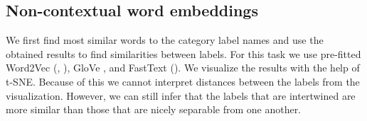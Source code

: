 \documentclass[fleqn,moreauthors,10pt]{ds_report}
\begin{document}
\subsection*{Non-contextual word embeddings}
We first find most similar words to the category label names and use the obtained results to find similarities between labels. For this task we use pre-fitted Word2Vec (\cite{mikolov2013efficient}, \cite{mikolov2013distributed}), GloVe \cite{pennington2014glove}, and FastText (\cite{bojanowski2016enriching}). We visualize the results with the help of t-SNE. Because of this we cannot interpret distances between the labels from the visualization. However, we can still infer that the labels that are intertwined are more similar than those that are nicely separable from one another. %

\end{document}
